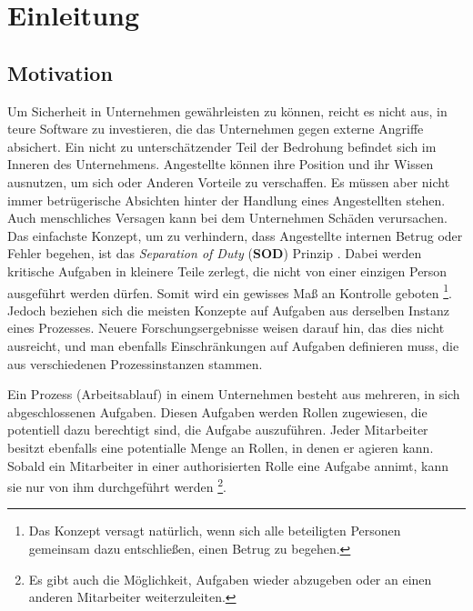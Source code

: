 
\chapter{Einleitung} %

\label{Chapter1} %



\section{Motivation}

Um Sicherheit in Unternehmen gewährleisten zu können, reicht es nicht aus, in teure Software zu investieren, die das Unternehmen gegen externe Angriffe absichert. Ein nicht zu unterschätzender Teil der Bedrohung befindet sich im Inneren des Unternehmens. Angestellte können ihre Position und ihr Wissen ausnutzen, um sich oder Anderen Vorteile zu verschaffen. Es müssen aber nicht immer betrügerische Absichten hinter der Handlung eines Angestellten stehen. Auch menschliches Versagen kann bei dem Unternehmen Schäden verursachen. Das einfachste Konzept, um zu verhindern, dass Angestellte internen Betrug oder Fehler begehen, ist das \textit{Separation of Duty} (\textbf{SOD}) Prinzip  \cite{SOD} \cite{SOD2}. Dabei werden kritische Aufgaben in kleinere Teile zerlegt, die nicht von einer einzigen Person ausgeführt werden dürfen. Somit wird ein gewisses Maß an Kontrolle geboten \footnote{Das Konzept versagt natürlich, wenn sich alle beteiligten Personen gemeinsam dazu entschließen, einen Betrug zu begehen.}. Jedoch beziehen sich die meisten Konzepte auf Aufgaben aus derselben Instanz eines Prozesses. Neuere Forschungsergebnisse \cite{warner_inter_instance} \cite{instance_spanning} weisen darauf hin, das dies nicht ausreicht, und man ebenfalls Einschränkungen auf Aufgaben definieren muss, die aus verschiedenen Prozessinstanzen stammen.

Ein Prozess (Arbeitsablauf) in einem Unternehmen besteht aus mehreren, in sich abgeschlossenen Aufgaben. Diesen Aufgaben werden Rollen zugewiesen, die potentiell dazu berechtigt sind, die Aufgabe auszuführen. Jeder Mitarbeiter besitzt ebenfalls eine potentialle Menge an Rollen, in denen er agieren kann. Sobald ein Mitarbeiter in einer authorisierten Rolle eine Aufgabe annimt, kann sie nur von ihm durchgeführt werden \footnote{Es gibt auch die Möglichkeit, Aufgaben wieder abzugeben oder an einen anderen Mitarbeiter weiterzuleiten.}.

